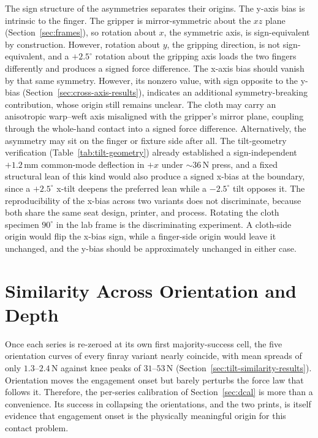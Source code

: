 The sign structure of the asymmetries separates their origins. The
y-axis bias is intrinsic to the finger. The gripper is
mirror-symmetric about the $xz$ plane (Section~\ref{sec:frames}), so
rotation about $x$, the symmetric axis, is sign-equivalent by
construction. However, rotation about $y$, the gripping direction, is
not sign-equivalent, and a $+2.5^{\circ}$ rotation about the gripping
axis loads the two fingers differently and produces a signed force
difference. The
x-axis bias should vanish by that same symmetry. However, its nonzero
value, with sign opposite to the y-bias
(Section~\ref{sec:cross-axis-results}), indicates an
additional symmetry-breaking contribution, whose origin still remains
unclear. The cloth may carry an anisotropic warp--weft axis
misaligned with the gripper's mirror plane, coupling through the
whole-hand contact into a signed force difference. Alternatively, the
asymmetry may sit on the finger or fixture side after all. The
tilt-geometry verification (Table~\ref{tab:tilt-geometry}) already
established a sign-independent $+1.2$\,mm common-mode deflection in
$+x$ under $\sim 36$\,N press, and a fixed structural lean of this
kind would also produce a signed x-bias at the boundary, since a
$+2.5^{\circ}$ x-tilt deepens the preferred lean while a
$-2.5^{\circ}$ tilt opposes it. The reproducibility of the x-bias
across two variants does not discriminate, because both share the same
seat design, printer, and process. Rotating the cloth specimen
$90^{\circ}$ in the lab frame is the discriminating experiment. A
cloth-side origin would flip the x-bias sign, while a finger-side
origin would leave it unchanged, and the y-bias should be approximately
unchanged in either case.

\section{Similarity Across Orientation and Depth}
\label{sec:similarity-discussion}
\label{sec:mount-tilt-mechanism}

Once each series is re-zeroed at its own first majority-success cell,
the five orientation curves of every finray variant nearly coincide,
with mean spreads of only $1.3$--$2.4$\,N against knee peaks of
$31$--$53$\,N (Section~\ref{sec:tilt-similarity-results}).
Orientation moves the engagement onset but barely perturbs the force
law that follows it. Therefore, the per-series calibration of
Section~\ref{sec:dcal} is more than a convenience. Its
success in collapsing the orientations, and the two prints, is itself
evidence that engagement onset is the physically meaningful origin for
this contact problem.

